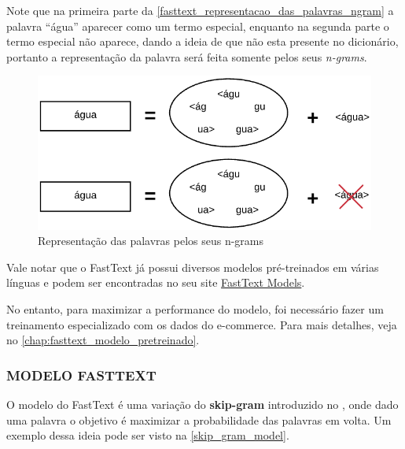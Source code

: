 Note que na primeira parte da \autoref{fasttext_representacao_das_palavras_ngram} a palavra “água” aparecer como um termo especial, enquanto na segunda parte o termo especial não aparece, dando a ideia de que não esta presente no dicionário, portanto a representação da palavra será feita somente pelos seus \textit{n-grams}.

\begin{figure}[htb]
	\caption{\label{fasttext_representacao_das_palavras_ngram} Representação das palavras pelos seus n-grams}
	\begin{center}
	    \includegraphics[scale=0.5]{artigo/recursos/imagens/fasttext_representacao_das_palavras_ngram.png}
	\end{center}
\end{figure}

Vale notar que o FastText já possui diversos modelos pré-treinados em várias línguas e podem ser encontradas no seu site \href{https://fasttext.cc/docs/en/english-vectors.html}{FastText Models}.

No entanto, para maximizar a performance do modelo, foi necessário fazer um treinamento especializado com os dados do e-commerce. Para mais detalhes, veja no \autoref{chap:fasttext_modelo_pretreinado}.

\subsubsection{MODELO FASTTEXT}

O modelo do FastText é uma variação do \textbf{skip-gram} introduzido no \cite{mikolov}, onde dado uma palavra o objetivo é maximizar a probabilidade das palavras em volta. Um exemplo dessa ideia pode ser visto na \autoref{skip_gram_model}.

